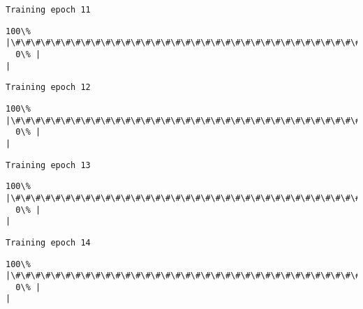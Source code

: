 \documentclass[11pt]{article}
\begin{document}
    \begin{Verbatim}[commandchars=\\\{\}]
Training epoch 11

    \end{Verbatim}

    \begin{Verbatim}[commandchars=\\\{\}]
100\% |\#\#\#\#\#\#\#\#\#\#\#\#\#\#\#\#\#\#\#\#\#\#\#\#\#\#\#\#\#\#\#\#\#\#\#\#\#\#\#\#\#\#\#\#\#\#\#\#\#\#\#\#\#\#\#\#\#\#\#\#\#\#\#\#\#\#\#\#\#\#\#\#|
  0\% |                                                                        |
    \end{Verbatim}

    \begin{Verbatim}[commandchars=\\\{\}]
Training epoch 12

    \end{Verbatim}

    \begin{Verbatim}[commandchars=\\\{\}]
100\% |\#\#\#\#\#\#\#\#\#\#\#\#\#\#\#\#\#\#\#\#\#\#\#\#\#\#\#\#\#\#\#\#\#\#\#\#\#\#\#\#\#\#\#\#\#\#\#\#\#\#\#\#\#\#\#\#\#\#\#\#\#\#\#\#\#\#\#\#\#\#\#\#|
  0\% |                                                                        |
    \end{Verbatim}

    \begin{Verbatim}[commandchars=\\\{\}]
Training epoch 13

    \end{Verbatim}

    \begin{Verbatim}[commandchars=\\\{\}]
100\% |\#\#\#\#\#\#\#\#\#\#\#\#\#\#\#\#\#\#\#\#\#\#\#\#\#\#\#\#\#\#\#\#\#\#\#\#\#\#\#\#\#\#\#\#\#\#\#\#\#\#\#\#\#\#\#\#\#\#\#\#\#\#\#\#\#\#\#\#\#\#\#\#|
  0\% |                                                                        |
    \end{Verbatim}

    \begin{Verbatim}[commandchars=\\\{\}]
Training epoch 14

    \end{Verbatim}

    \begin{Verbatim}[commandchars=\\\{\}]
100\% |\#\#\#\#\#\#\#\#\#\#\#\#\#\#\#\#\#\#\#\#\#\#\#\#\#\#\#\#\#\#\#\#\#\#\#\#\#\#\#\#\#\#\#\#\#\#\#\#\#\#\#\#\#\#\#\#\#\#\#\#\#\#\#\#\#\#\#\#\#\#\#\#|
  0\% |                                                                        |
    \end{Verbatim}
\end{document}
